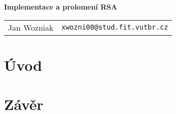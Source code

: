 \documentclass[a4paper,11pt]{article}
\begin{document}
\begin{center}{\LARGE\textbf{Implementace a prolomení RSA}}\\[0.2cm]
\newcommand{\autor}[2]{#1&\texttt{#2@stud.fit.vutbr.cz}\tabularnewline}
\begin{tabular}{ll}
    \autor{Jan Wozniak}{xwozni00}
\end{tabular}
\end{center}


\section{Úvod}

\section{Závěr}
\end{document}

